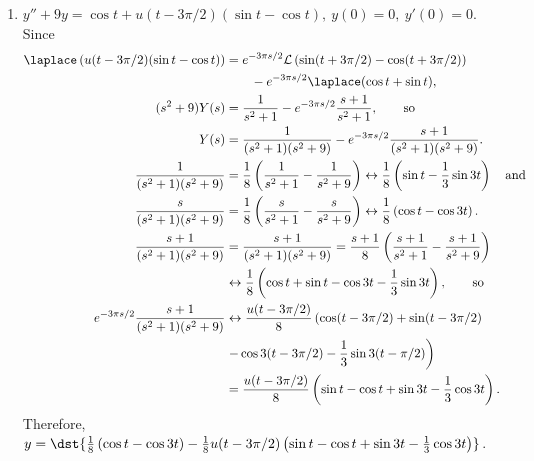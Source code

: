 \documentclass[openany]{book}
\newenvironment{sectionSolutions}{
 \begin{enumerate}[item-label={\thesection.\arabic{enumi}.}]
}{
 \end{enumerate}
}
\begin{document}
\begin{sectionSolutions}
\item
 $y''+9y=\cos t+u(t-3\pi/2)(\sin t-\cos t),\ y(0)=0,\
y'(0)=0$. Since
\begin{align*}
\laplace \left(u(t-3\pi/2)(\sin t-\cos t)\right)&=
e^{-3\pi s/2}{\cal
L}\left(\sin(t+3\pi/2)-\cos(t+3\pi/2)\right)\\
&\qquad-e^{-3\pi s/2}\laplace (\cos t+\sin t),\\
(s^2+9)Y(s)&=\frac{1}{ s^2+1}-e^{-3\pi s/2}\frac{s+1}{
s^2+1},\qquad\text{so}\\
Y(s)&=\frac{1}{(s^2+1)(s^2+9)}-e^{-3\pi s/2}\frac{s+1}{
(s^2+1)(s^2+9)}.
\\
\frac{1}{(s^2+1)(s^2+9)}&=\frac{1}{8}\left(\frac{1}{ s^2+1}-\frac{1}{
s^2+9}\right)\leftrightarrow\frac{1}{8}\left(\sin
t-\frac{1}{3}\sin3t\right)\quad\text{and}
\\
\frac{s}{(s^2+1)(s^2+9)}&=\frac{1}{8}\left(\frac{s}{ s^2+1}-\frac{s}{
s^2+9}\right)\leftrightarrow\frac{1}{8}\left(\cos
t-\cos3t\right).\\
\frac{s+1}{(s^2+1)(s^2+9)}&=\frac{s+1}{(s^2+1)(s^2+9)}=
\frac{s+1}{8}\left(\frac{s+1}{ s^2+1}-\frac{s+1}{s^2+9}\right)\\
&\leftrightarrow\frac{1}{8}\left(\cos t+\sin
t-\cos3t-\frac{1}{3}\sin3t\right),\qquad\text{so}\\
e^{-3\pi s/2}\frac{s+1}{(s^2+1)(s^2+9)}&\leftrightarrow
\frac{u(t-3\pi/2)}{8}\left(\cos(t-3\pi/2)+\sin(t-3\pi/2)\right.\\
&\left. -\cos3(t-3\pi/2)-\frac{1}{3}\sin3(t-\pi/2)\right)\\
&=\frac{u(t-3\pi/2)}{8}\left(\sin t-\cos t+
\sin3t-\frac{1}{3}\cos3t\right).
\end{align*}
Therefore,
$y=\dst{\frac{1}{ 8}\left(\cos t-\cos3t\right)
-\frac{1}{8} u(t-3\pi/2)\left(\sin t-\cos t+
\sin 3t-\frac{1}{3}\cos 3t\right)}$.



\end{sectionSolutions}
\end{document}
